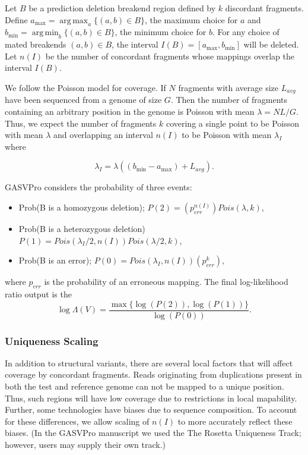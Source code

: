\documentclass[11pt]{article}
\DeclareMathOperator*{\argmax}{arg\,max}
\DeclareMathOperator*{\argmin}{arg\,min}
\begin{document}
Let $B$ be a prediction deletion breakend region defined by $k$ discordant fragments.  Define $a_{\max} = \argmax_{a} \{(a,b) \in B\}$, the maximum choice for $a$ and $b_{\min} = \argmin_{b} \{(a,b) \in B\}$, the minimum choice for $b$. For any choice of mated breakends $(a,b) \in B$, the interval $I(B) = [a_{\max},b_{\min}]$ will be deleted.  Let $n(I)$ be the number of concordant fragments whose mappings overlap the interval $I(B)$.  

We follow the Poisson model for coverage. If $N$ fragments with average size $L_{avg}$ have been sequenced from a genome of size $G$. Then the number of fragments containing an arbitrary position in the genome is Poisson with mean $\lambda = NL/G$. Thus, we expect the number of fragments $k$ covering a single point to be Poisson with mean $\lambda$ and overlapping an interval $n(I)$ to be Poisson with mean $\lambda_{I}$ where

$$\lambda_{I} = \lambda( (b_{\min} - a_{\max}) + L_{avg}).$$

GASVPro considers the probability of three events: 
\begin{itemize}
\item Prob(B is a homozygous deletion); $P(2) = \left( p_{err}^{n(I)} \right) Pois(\lambda, k)$,
\item Prob(B is a heterozygous deletion) $P(1) = Pois\left(\lambda_I/2, n(I) \right) Pois(\lambda/2, k)$, 
\item Prob(B is an error); $P(0)  = Pois\left(\lambda_I, n(I) \right) \left( p_{err}^{k}\right),$
\end{itemize}

\noindent where $p_{err}$ is the probability of an erroneous mapping. The final log-likelihood ratio output is the 
\begin{equation}
\log \Lambda(V) = \frac{\max \{\log( P(2) ), \log(P(1)) \}}{ \log(P(0))}.
\end{equation}


\subsubsection{Uniqueness Scaling}
In addition to structural variants, there are several local factors that will affect coverage by concordant fragments. Reads originating from duplications present in both the test and reference genome can not be mapped to a unique position. Thus, such regions will have low coverage due to restrictions in local mapability. Further, some technologies have biases due to sequence composition. To account for these differences, we allow scaling of $n(I)$ to more accurately reflect these biases. (In the GASVPro manuscript we used the The Rosetta Uniqueness Track; however, users may supply their own track.) 
\end{document}
